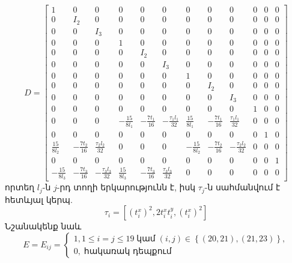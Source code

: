 \documentclass[fleqn, bachelor,subf,12pt,notitlepage]{article}
\begin{document}
\begin{equation}
D = \left[\begin{array}{cccccccccccc}1 & 0 & 0 & 0 & 0 & 0 & 0 & 0 & 0 & 0 & 0 & 0\\
0 & I_{2} & 0 & 0 & 0 & 0 & 0 & 0 & 0 & 0 & 0 & 0\\
0 & 0 & I_{3} & 0 & 0 & 0 & 0 & 0 & 0 & 0 & 0 & 0\\
0 & 0 & 0 & 1 & 0 & 0 & 0 & 0 & 0 & 0 & 0 & 0\\
0 & 0 & 0 & 0 & I_{2} & 0 & 0 & 0 & 0 & 0 & 0 & 0\\
0 & 0 & 0 & 0 & 0 & I_{3} & 0 & 0 & 0 & 0 & 0 & 0\\
0 & 0 & 0 & 0 & 0 & 0 & 1 & 0 & 0 & 0 & 0 & 0\\
0 & 0 & 0 & 0 & 0 & 0 & 0 & I_{2} & 0 & 0 & 0 & 0\\
0 & 0 & 0 & 0 & 0 & 0 & 0 & 0 & I_{3} & 0 & 0 & 0\\
0 & 0 & 0 & 0 & 0 & 0 & 0 & 0 & 0 & 1 & 0 & 0\\
0 & 0 & 0 & - \frac{15}{8 l_{1}} & - \frac{7 t_{1}}{16} & - \frac{\tau_{1} l_{1}}{32} & \frac{15}{8 l_{1}} & - \frac{7 t_{1}}{16} & \frac{\tau_{1} l_{1}}{32} & 0 & 0 & 0\\
0 & 0 & 0 & 0 & 0 & 0 & 0 & 0 & 0 & 0 & 1 & 0\\
\frac{15}{8 l_{2}} & - \frac{7 t_{2}}{16} & \frac{\tau_{2} l_{2}}{32} & 0 & 0 & 0 & - \frac{15}{8 l_{2}} & - \frac{7 t_{2}}{16} & - \frac{\tau_{2} l_{2}}{32} & 0 & 0 & 0\\
0 & 0 & 0 & 0 & 0 & 0 & 0 & 0 & 0 & 0 & 0 & 1\\- \frac{15}{8 l_{3}} & - \frac{7 t_{3}}{16} & - \frac{\tau_{3} l_{3}}{32} & \frac{15}{8 l_{3}} & - \frac{7 t_{3}}{16} & \frac{\tau_{3} l_{3}}{32} & 0 & 0 & 0 & 0 & 0 & 0
\end{array}\right]
\end{equation}
որտեղ $l_{j}$-ն $j$-րդ տողի երկարությունն է, իսկ $\tau_{j}$-ն սահմանվում է հետևյալ կերպ.
\begin{equation}
				\tau_{i}=\left[\left(t_{i}^{x}\right)^{2},  2t_{i}^{x}t_{i}^{y},  \left(t_{i}^{x}\right)^{2} \right]
\end{equation}
Նշանակենք նաև
\begin{equation}
E = E_{ij} = \begin{cases}
1, 1\leq i=j\leq19 \; \text{կամ} \; (i,j) \in \left\{(20, 21), (21, 23)\right\}, \\
0, \; \text{հակառակ դեպքում}
\end{cases}
\end{equation}
\end{document}
